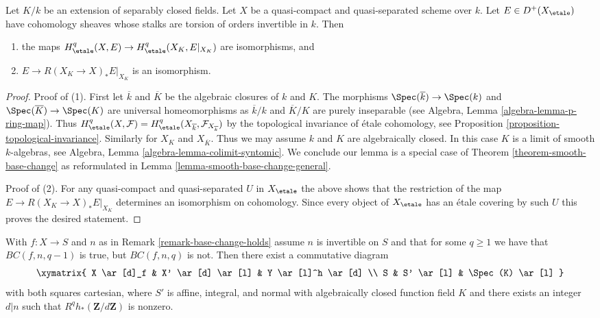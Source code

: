 \begin{lemma}
\label{lemma-smooth-base-change-separably-closed}
Let $K/k$ be an extension of separably closed fields. Let $X$
be a quasi-compact and quasi-separated scheme over $k$.
Let $E \in D^+(X_\etale)$ have cohomology sheaves whose stalks
are torsion of orders invertible in $k$. Then
\begin{enumerate}
\item the maps $H^q_\etale(X, E) \to H^q_\etale(X_K, E|_{X_K})$
are isomorphisms, and
\item $E \to R(X_K \to X)_*E|_{X_K}$ is an isomorphism.
\end{enumerate}
\end{lemma}

\begin{proof}
Proof of (1). First let $\overline{k}$ and $\overline{K}$
be the algebraic closures
of $k$ and $K$. The morphisms $\Spec(\overline{k}) \to \Spec(k)$ and
$\Spec(\overline{K}) \to \Spec(K)$ are universal homeomorphisms
as $\overline{k}/k$ and $\overline{K}/K$ are purely inseparable
(see Algebra, Lemma \ref{algebra-lemma-p-ring-map}).
Thus $H^q_\etale(X, \mathcal{F}) =
H^q_\etale(X_{\overline{k}}, \mathcal{F}_{X_{\overline{k}}})$ by
the topological invariance of \'etale cohomology, see
Proposition \ref{proposition-topological-invariance}.
Similarly for $X_K$ and $X_{\overline{K}}$.
Thus we may assume $k$ and $K$ are algebraically closed.
In this case $K$ is a limit of smooth $k$-algebras, see
Algebra, Lemma \ref{algebra-lemma-colimit-syntomic}.
We conclude our lemma is a special case of
Theorem \ref{theorem-smooth-base-change} as reformulated in
Lemma \ref{lemma-smooth-base-change-general}.

\medskip\noindent
Proof of (2). For any quasi-compact and quasi-separated $U$ in $X_\etale$
the above shows that the restriction of the map
$E \to R(X_K \to X)_*E|_{X_K}$ determines an isomorphism on cohomology.
Since every object of $X_\etale$ has an \'etale covering by such $U$
this proves the desired statement.
\end{proof}

\begin{lemma}
\label{lemma-base-change-does-not-hold-post}
With $f : X \to S$ and $n$ as in Remark \ref{remark-base-change-holds}
assume $n$ is invertible on $S$ and that for some $q \geq 1$
we have that $BC(f, n, q - 1)$ is true, but $BC(f, n, q)$ is not.
Then there exist a commutative diagram
$$
\xymatrix{
X \ar[d]_f & X' \ar[d] \ar[l] & Y \ar[l]^h \ar[d] \\
S & S' \ar[l] & \Spec(K) \ar[l]
}
$$
with both squares cartesian, where $S'$ is affine, integral, and normal
with algebraically closed function field $K$ and there exists an integer
$d | n$ such that $R^qh_*(\mathbf{Z}/d\mathbf{Z})$ is nonzero.
\end{lemma}

